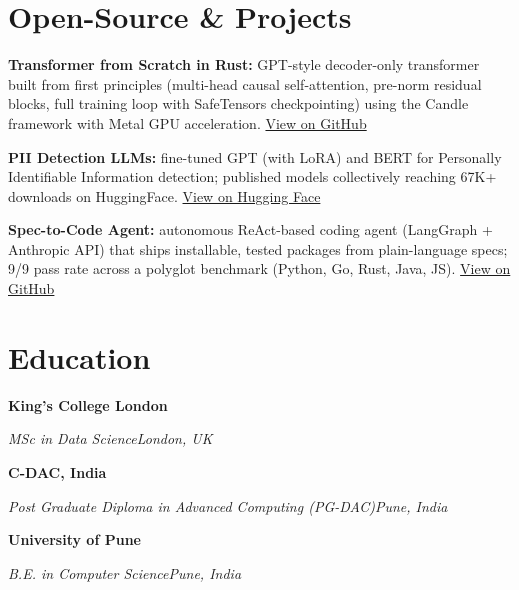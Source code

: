 \documentclass[10pt,a4paper]{article}
\newcommand{\entry}[4]{%
  {\color{company}\bfseries #1}\hfill {\color{muted}#2}\par
  \vspace{1pt}
  {\itshape #3}\hfill {\color{muted}\itshape #4}\par
  \vspace{3pt}%
}
\begin{document}
\section{Open-Source \& Projects}
\begin{tight}
  \item \textbf{Transformer from Scratch in Rust:} GPT-style decoder-only transformer built from first principles (multi-head causal self-attention, pre-norm residual blocks, full training loop with SafeTensors checkpointing) using the Candle framework with Metal GPU acceleration. \href{https://github.com/abhijeetscode/transformer-rust}{View on GitHub}
  \item \textbf{PII Detection LLMs:} fine-tuned GPT (with LoRA) and BERT for Personally Identifiable Information detection; published models collectively reaching 67K+ downloads on HuggingFace. \href{https://huggingface.co/ab-ai/pii_model}{View on Hugging Face}
  \item \textbf{Spec-to-Code Agent:} autonomous ReAct-based coding agent (LangGraph + Anthropic API) that ships installable, tested packages from plain-language specs; 9/9 pass rate across a polyglot benchmark (Python, Go, Rust, Java, JS). \href{https://github.com/abhijeetscode/Spec-to-Code-Agent}{View on GitHub}
\end{tight}

\section{Education}
\entry{King's College London}{}{MSc in Data Science}{London, UK}
\vspace{-3pt}
\entry{C-DAC, India}{}{Post Graduate Diploma in Advanced Computing (PG-DAC)}{Pune, India}
\vspace{-3pt}
\entry{University of Pune}{}{B.E. in Computer Science}{Pune, India}
\end{document}
